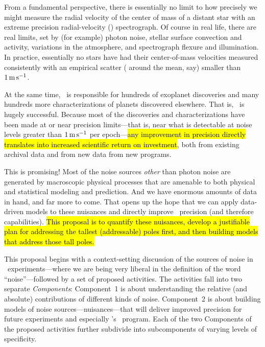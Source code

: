 \documentclass[12pt, fullpage, letterpaper]{article}
\begin{document}
\noindent
From a fundamental perspective, there is essentially no limit to how
precisely we might measure the radial velocity of the center of mass
of a distant star with an extreme precision radial-velocity (\EPRV) spectrograph.
Of course in real life, there are real limits, set
by (for example) photon noise, stellar surface convection and activity,
variations in the atmosphere, and spectrograph flexure and illumination. In practice,
essentially no stars have had their center-of-mass velocities measured
consistently with an empirical scatter ( around the mean,
say) smaller than $1\,{\mathrm{m\,s^{-1}}}$.

At the same time, \EPRV\ is responsible for hundreds of 
exoplanet discoveries and many hundreds more 
characterizations of planets
discovered elsewhere. That is, \EPRV\ is hugely successful.
Because most of the discoveries and characterizations have been made
at or near precision limits---that is, near what is detectable at noise levels
greater than $1\,{\mathrm{m\,s^{-1}}}$ per epoch---\hl{any improvement in precision directly
translates into increased scientific return on investment},
both from existing archival data and from new data from new programs.

This is promising! Most of the noise sources \emph{other} than photon noise
are generated by macroscopic physical processes that are amenable to both
physical and statistical modeling and prediction. And we have enormous amounts
of data in hand, and far more to come. That opens up the hope
that we can apply data-driven models to these nuisances and directly improve
\EPRV\ precision (and therefore capabilities). \hl{This proposal is to quantify
these nuisances, develop a justifiable plan for addressing the tallest
(addressable) poles first, and then building models that address those tall
poles.}

This proposal begins with a context-setting discussion of the sources
of noise in \EPRV\ experiments---where we are being very liberal in the definition of the
word ``noise''---followed by a set of proposed activities. The activities fall into two
separate \emph{Components}: Component~1 is about understanding the relative
(and absolute) contributions of different kinds of noise. Component~2
is about building models of noise sources---nuisances---that will
deliver improved precision for future experiments and especially \NASA's
\NNEXPLORE\ program. Each of the two Components of the proposed activities
further subdivide into subcomponents of varying levels of specificity.
\end{document}
